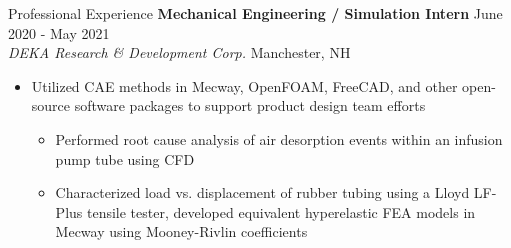 \documentclass{resume}
\begin{document}
\begin{rSection}{Professional Experience}
    {\bf Mechanical Engineering / Simulation Intern} \hfill {June 2020 - May 2021}
    \\ {\em DEKA Research \& Development Corp.} \hfill {Manchester, NH}
    \vspace{-0.5em}
    \begin{itemize}[label={\tiny\raisebox{1ex}{\textbullet}}, noitemsep]
        \item Utilized CAE methods in Mecway, OpenFOAM, FreeCAD, and other open-source software packages to support product design team efforts
              \begin{itemize}[label={\tiny\raisebox{1ex}{\textbullet}}, noitemsep]
                  \item Performed root cause analysis of air desorption events within an infusion pump tube using CFD
                  \item Characterized load vs. displacement of rubber tubing using a Lloyd LF-Plus tensile tester, developed equivalent hyperelastic FEA models in Mecway using Mooney-Rivlin coefficients
              \end{itemize}{}
    \end{itemize}{}
    \vspace{-0.4em}
\end{rSection}
\end{document}
